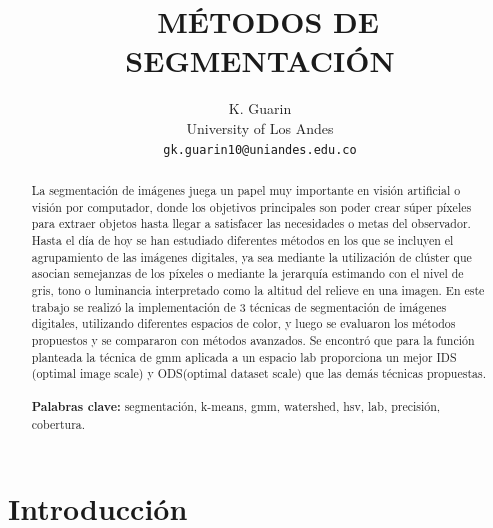\documentclass[10pt,twocolumn,letterpaper]{article}
\begin{document}
\title{\ MÉTODOS DE SEGMENTACIÓN}

\author{K. Guarin \\
University of Los Andes\\
{\tt\small gk.guarin10@uniandes.edu.co}
}
\maketitle
\begin{abstract}
 La segmentación de imágenes juega un papel muy importante en visión artificial o visión por computador, donde los objetivos principales son poder crear súper píxeles para extraer objetos hasta llegar a satisfacer las necesidades o metas del observador.
 Hasta el día de hoy se han estudiado diferentes métodos en los que se incluyen el agrupamiento de las imágenes digitales, ya sea mediante la utilización de clúster que asocian semejanzas de los píxeles o mediante la jerarquía estimando con el nivel de gris,
 tono o luminancia interpretado como la altitud del relieve en una imagen. En este trabajo se realizó la implementación de 3 técnicas de segmentación de imágenes digitales, utilizando diferentes espacios de color, y luego se evaluaron los métodos propuestos
 y se compararon con métodos avanzados. Se encontró que para la función planteada la técnica de gmm aplicada a un espacio lab proporciona un mejor IDS (optimal image scale) y ODS(optimal dataset scale) que las demás técnicas propuestas.
\\
\\
   {\bf Palabras clave:} segmentación, k-means, gmm, watershed, hsv, lab, precisión, cobertura.
   
   \end{abstract}

\section{Introducción}
\end{document}
